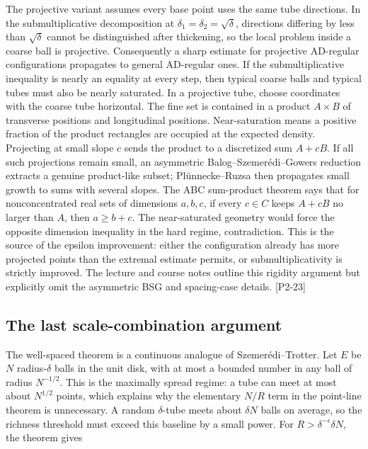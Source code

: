 The projective variant assumes every base point uses the same tube directions. In the submultiplicative decomposition at \(\delta_1=\delta_2=\sqrt\delta\), directions differing by less than \(\sqrt\delta\) cannot be distinguished after thickening, so the local problem inside a coarse ball is projective. Consequently a sharp estimate for projective AD-regular configurations propagates to general AD-regular ones. If the submultiplicative inequality is nearly an equality at every step, then typical coarse balls and typical tubes must also be nearly saturated. In a projective tube, choose coordinates with the coarse tube horizontal. The fine set is contained in a product \(A\times B\) of transverse positions and longitudinal positions. Near-saturation means a positive fraction of the product rectangles are occupied at the expected density. Projecting at small slope \(c\) sends the product to a discretized sum \(A+cB\). If all such projections remain small, an asymmetric Balog--Szemerédi--Gowers reduction extracts a genuine product-like subset; Plünnecke--Ruzsa then propagates small growth to sums with several slopes. The ABC sum-product theorem says that for nonconcentrated real sets of dimensions \(a,b,c\), if every \(c\in C\) keeps \(A+cB\) no larger than \(A\), then \(a\ge b+c\). The near-saturated geometry would force the opposite dimension inequality in the hard regime, contradiction. This is the source of the epsilon improvement: either the configuration already has more projected points than the extremal estimate permits, or submultiplicativity is strictly improved. The lecture and course notes outline this rigidity argument but explicitly omit the asymmetric BSG and spacing-case details. {[}P2-23{]}

\subsection{The last scale-combination argument}\label{04-visual-computing-ii-ch033-the-last-scale-combination-argument-1}

The well-spaced theorem is a continuous analogue of Szemerédi--Trotter. Let \(E\) be \(N\) radius-\(\delta\) balls in the unit disk, with at most a bounded number in any ball of radius \(N^{-1/2}\). This is the maximally spread regime: a tube can meet at most about \(N^{1/2}\) points, which explains why the elementary \(N/R\) term in the point-line theorem is unnecessary. A random \(\delta\)-tube meets about \(\delta N\) balls on average, so the richness threshold must exceed this baseline by a small power. For \(R>\delta^{-\epsilon}\delta N\), the theorem gives


